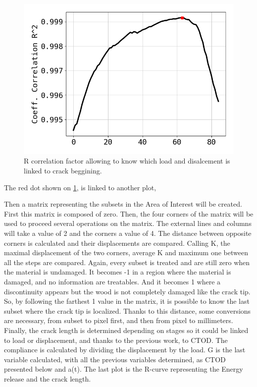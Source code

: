 \begin{figure}[h]
\centering
\includegraphics[scale=0.3]{Figures/Correlation_factor}
\decoRule
\caption[R correlation factor]{R correlation factor allowing to know which load and disalcement is linked to crack beggining.}
\label{fig:Fig12}
\end{figure}

The red dot shown on \ref{fig:Fig12}, is linked to another plot,

Then a matrix representing the subsets in the Area of Interest will be created. First this matrix is composed of zero. Then, the four corners of the matrix will be used to proceed several operations on the matrix. The external lines and columns will take a value of 2 and the corners a value of 4. The distance between opposite corners is calculated and their displacements are compared. Calling K, the maximal displacement of the two corners, average K and maximum one between all the steps are compared. Again, every subset is treated and are still zero when the material is undamaged. It becomes -1 in a region where the material is damaged, and no information are treatables. And it becomes 1 where a discontinuity appears but the wood is not completely damaged like the crack tip. So, by following the farthest 1 value in the matrix, it is possible to know the last subset where the crack tip is localized. Thanks to this distance, some conversions are necessary, from subset to pixel first, and then from pixel to millimeters. Finally, the crack length is determined depending on stages so it could be linked to load or displacement, and thanks to the previous work, to CTOD. The compliance is calculated by dividing the displacement by the load. G is the last variable calculated, with all the previous variables determined, as CTOD presented below and a(t). The last plot is the R-curve representing the Energy release and the crack length.

